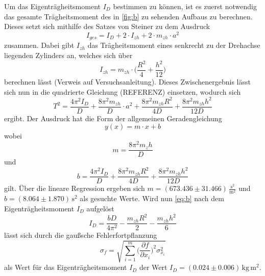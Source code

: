 \noindent
Um das Eigenträgheitsmoment $I_D$ bestimmen zu können, ist es zuerst notwendig das gesamte 
Trägheitsmoment des in \ref{fig:b} zu sehenden Aufbaus zu berechnen. Dieses setzt sich mithilfe 
des Satzes von Steiner zu dem Ausdruck
\begin{equation}
    I_{ges} = I_D + 2\cdot I_{zh} + 2\cdot m_{zh} \cdot a^2
\end{equation}
\noindent
zusammen. Dabei gibt $I_{zh}$ das Trägheitsmoment eines senkrecht zu der Drehachse liegenden Zylinders an, 
welches sich über 
\begin{equation}
    I_{zh} = m_{zh} \cdot \Big( \frac{R^2}{4} + \frac{h^2}{12} \Big)
\end{equation}
\noindent
berechnen lässt (Verweis auf Versuchsanleitung). Dieses Zwischenergebnis lässt sich nun in die 
quadrierte Gleichung (REFERENZ) einsetzen, wodurch sich 
\begin{equation}
    T^2 = \frac{4 \pi^2 I_D}{D} + \frac{8 \pi^2 m_{zh}}{D} \cdot a^2 + \frac{8 \pi^2 m_{zh} R^2}{4 D} + \frac{8 \pi^2 m_{zh} h^2}{12 D} 
\end{equation}
\noindent 
ergibt. Der Ausdruck hat die Form der allgemeinen Geradengleichung
\begin{equation}
    y(x) = m\cdot x + b
\end{equation}
\noindent
wobei 
\begin{equation}
    m = \frac{8 \pi^2 m_zh}{D}
\end{equation}
und 
\begin{equation}
    b = \frac{4 \pi^2 I_D}{D} + \frac{8 \pi^2 m_{zh} R^2}{4 D} + \frac{8 \pi^2 m_{zh} h^2}{12 D}
    \label{eq:b}
\end{equation}
gilt. Über die lineare Regression ergeben sich $m = (673.436 \pm 31.466)\,\frac{\si{\second}^2}{\si{\meter}^2}$ und $b = (8.064 \pm 1.870)\,\si{\second}^2$ als gesuchte Werte.
Wird nun \ref{eq:b} nach dem Eigenträgheitsmoment $I_D$ aufgelöst
\begin{equation}
    I_D = \frac{b D}{4 \pi^2} - \frac{m_{zh} R^2}{2} - \frac{m_{zh} h^2}{6}
\end{equation}
\noindent
lässt sich durch die gaußsche Fehlerfortpflanzung
\begin{equation}
    \sigma_f = \sqrt{\sum_{i=1}^m   \Big(   \frac{\partial f}{\partial x_i} \Big)^2 \sigma_{x_{i}}^2       }
\end{equation}
\noindent
als Wert für das Eigenträgheitsmoment $I_D$ der Wert $I_D = (0.024 \pm 0.006)\, \si{\kg}\,\si{\meter}^2$.




